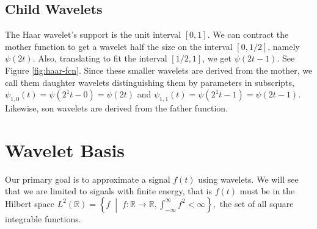 \documentclass[12pt]{article}
\def\RR{\mathbb{R}}
\theoremstyle{definition}
\begin{document}
  \subsection{Child Wavelets}

  The Haar wavelet's support is the unit interval \([0,1]\). We can contract the mother function to get a wavelet half the size on the interval \([0,1/2]\), namely \(\psi(2t)\). Also, translating to fit the interval \([1/2,1]\), we get \(\psi(2t-1)\). See Figure \ref{fig:haar-fcn}. Since these smaller wavelets are derived from the mother, we call them daughter wavelets distinguishing them by parameters in subscripts, \(\psi_{1,0}(t) = \psi(2^1t-0) = \psi(2t)\) and \(\psi_{1,1}(t) = \psi(2^1t - 1) = \psi(2t-1)\). Likewise, son wavelets are derived from the father function.
  
  \section{Wavelet Basis}

  Our primary goal is to approximate a signal \(f(t)\) using wavelets. We will see that we are limited to signals with finite energy, that is \(f(t)\) must be in the Hilbert space
  \(L^2(\RR) = \left\{f \; \middle| \; f : \RR \to \RR, \int_{-\infty}^\infty f^2 < \infty\right\},\)
  the set of all square integrable functions.
\end{document}
